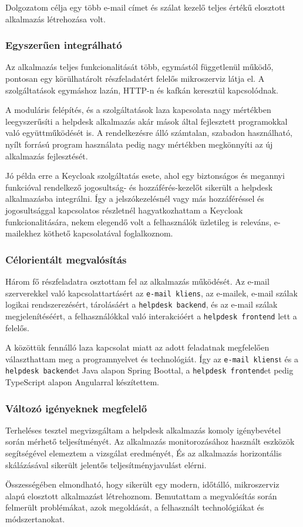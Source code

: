 Dolgozatom célja egy több e-mail címet és szálat kezelő teljes értékű elosztott alkalmazás létrehozása volt.

\subsubsection*{Egyszerűen integrálható}
Az alkalmazás teljes funkcionalitását több, egymástól függetlenül működő, pontosan egy körülhatárolt részfeladatért felelős mikroszerviz látja el. A szolgáltatások egymáshoz lazán, HTTP-n és kafkán keresztül kapcsolódnak.

A moduláris felépítés, és a szolgáltatások laza kapcsolata nagy mértékben leegyszerűsíti a helpdesk alkalmazás akár mások által fejlesztett programokkal való együttműködését is. A rendelkezésre álló számtalan, szabadon használható, nyílt forrású program használata pedig nagy mértékben megkönnyíti az új alkalmazás fejlesztését.

Jó példa erre a Keycloak szolgáltatás esete, ahol egy biztonságos és megannyi funkcióval rendelkező jogosultság- és hozzáférés-kezelőt sikerült a helpdesk alkalmazásba integrálni. Így a jelszókezelésnél vagy más hozzáféréssel és jogosultsággal kapcsolatos részletnél hagyatkozhattam a Keycloak funkcionalitására, nekem elegendő volt a felhasználók üzletileg is releváns, e-mailekhez köthető kapcsolatával foglalkoznom.


\subsubsection*{Célorientált megvalósítás}
Három fő részfeladatra osztottam fel az alkalmazás működését. Az e-mail szerverekkel való kapcsolattartásért az \texttt{e-mail kliens}, az e-mailek, e-mail szálak logikai rendszerezésért, tárolásáért a \texttt{helpdesk backend}, és az e-mail szálak megjelenítéséért, a felhasználókkal való interakcióért a \texttt{helpdesk frontend} lett a felelős.

A közöttük fennálló laza kapcsolat miatt az adott feladatnak megfelelően választhattam meg a programnyelvet és technológiát. Így az \texttt{e-mail kliens}t és a \texttt{helpdesk backend}et Java alapon Spring Boottal, a \texttt{helpdesk frontend}et pedig TypeScript alapon Angularral készítettem.

	
\subsubsection*{Változó igényeknek megfelelő}
Terheléses tesztel megvizsgáltam a helpdesk alkalmazás komoly igénybevétel során mérhető teljesítményét. Az alkalmazás monitorozásához használt eszközök segítségével elemeztem a vizsgálat eredményét, És az alkalmazás horizontális skálázásával sikerült jelentős teljesítményjavulást elérni.

\bigskip
\bigskip
Összességében elmondható, hogy sikerült egy modern, időtálló, mikroszerviz alapú elosztott alkalmazást létrehoznom. Bemutattam a megvalósítás során felmerült problémákat, azok megoldását, a felhasznált technológiákat és módszertanokat.
